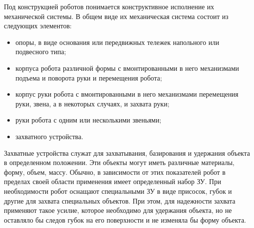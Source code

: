 \documentclass[unicode, 12pt, a4paper, oneside]{article}
\begin{document}
Под конструкцией роботов понимается конструктивное исполнение их механической системы.
В общем виде их механическая система состоит из следующих элементов:
\begin{itemize}
\item опоры, в виде основания или передвижных тележек напольного или подвесного типа;
\item корпуса робота различной формы с вмонтированными в него механизмами подъема и поворота руки и перемещения робота;
\item корпус руки робота с вмонтированными в него механизмами перемещения руки, звена, а в некоторых случаях, и захвата руки;
\item руки робота с одним или несколькими звеньями;
\item захватного устройства.
\end{itemize}

Захватные устройства служат для захватывания, базирования и удержания объекта в определенном положении. Эти объекты могут иметь различные материалы, форму, объем, массу. Обычно, в зависимости от этих показателей робот в пределах своей области применения имеет определенный набор ЗУ.
При необходимости робот оснащают специальными ЗУ в виде присосок, губок и другие для захвата специальных объектов. При этом, для надежности захвата применяют такое усилие, которое необходимо для удержания объекта, но не оставляло бы следов губок на его поверхности и не изменяла бы форму объекта.
\end{document}
